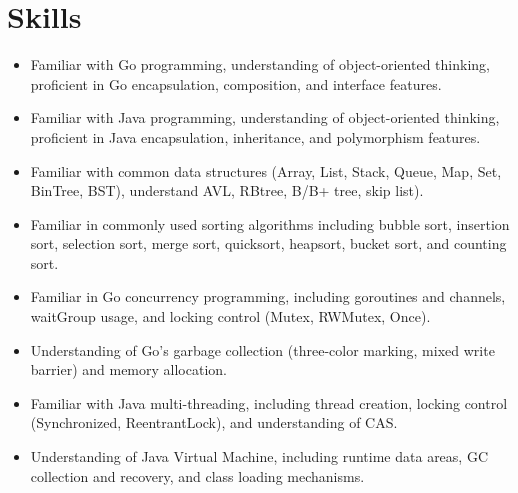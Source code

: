 \documentclass{resume}
\newcommand{\en}[1]{#1}
\newcommand{\zh}[1]{}
\begin{document}
\section{\en{Skills}\zh{技能}}
\begin{itemize}[parsep=0.25ex]
     \item \en{Familiar with Go programming, understanding of object-oriented thinking, proficient in Go encapsulation, composition, and interface features.}
           \zh{熟悉Java语言，理解面向对象思想，掌握 Java 封装、继承和多态特性}

     \item \en{Familiar with Java programming, understanding of object-oriented thinking, proficient in Java encapsulation, inheritance, and polymorphism features.}
           \zh{了解Go、Python，运维CMP并进行了开发，理解面向对象思想，掌握封装、组合和接口的特性}

     \item \en{Familiar with common data structures (Array, List, Stack, Queue, Map, Set, BinTree, BST),
                understand AVL, RBtree, B/B+ tree, skip list).}
           \zh{熟悉常见容器（List、Set、Map）、多线程并发（读写锁、阻塞队列、线程池、ConcurrentHashMap等）}

     \item \en{Familiar in commonly used sorting algorithms including bubble sort, insertion sort, selection sort, merge sort, quicksort, heapsort, bucket sort, and counting sort.}
           \zh{熟悉SpringBoot等主流框架，可以快速构建并完成工程配置，如Git，Maven，日志优化，配置文件，集成热部署}

     \item \en{Familiar in Go concurrency programming, including goroutines and channels, waitGroup usage, and locking control (Mutex, RWMutex, Once).}
           \zh{了解JVM相关知识，如垃圾回收（GC算法、垃圾收集器）和类加载机制、双亲委派机模型}

     \item \en{Understanding of Go's garbage collection (three-color marking, mixed write barrier) and memory allocation.}
           \zh{熟练使用 MVC 模式进行项目设计，熟悉单例，策略，工厂模式等常见的设计模式}

     \item \en{Familiar with Java multi-threading, including thread creation, locking control (Synchronized, ReentrantLock), and understanding of CAS.}
           \zh{了解Git基本操作以及Linux相关基本知识，熟练使用Docker等容器技术进行CI/CD}

     \item \en{Understanding of Java Virtual Machine, including runtime data areas, GC collection and recovery, and class loading mechanisms.}
           \zh{熟悉 MySQL 索引原理、查询性能优化，了解存储引擎 (InnoDB、MyISAM)、主从复制}


\end{itemize}
\end{document}
